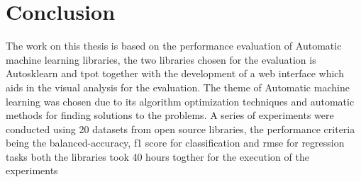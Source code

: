 \chapter{Conclusion}\label{chap:conclusion}

The work on this thesis is based on the performance evaluation of Automatic machine learning libraries, the two libraries chosen for the evaluation is Autosklearn and tpot together with the development of a web interface which aids in the visual analysis for the evaluation. The theme of Automatic machine learning was chosen due to its algorithm optimization techniques and automatic methods for finding solutions to the problems. A series of experiments were conducted using 20 datasets from open source libraries, the performance criteria being the balanced-accuracy, f1 score for classification and rmse for regression tasks both the libraries took 40 hours togther for the  execution of the experiments
